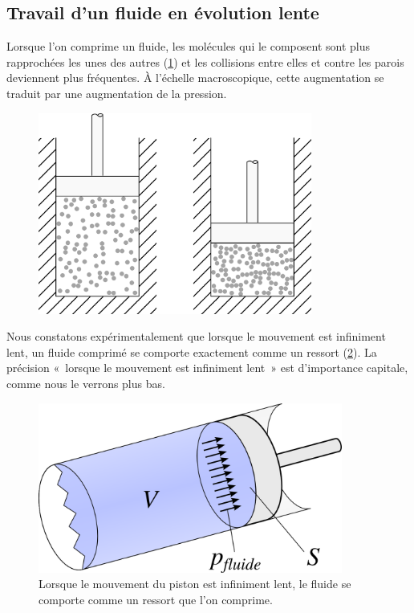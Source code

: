	\subsection{Travail d’un fluide en évolution lente}

		Lorsque l’on comprime un fluide, les molécules qui le composent sont plus rapprochées les unes des autres (\cref{fig_molécules_compression_lente}) et les collisions entre elles et contre les parois deviennent plus fréquentes. À l’échelle macroscopique, cette augmentation se traduit par une augmentation de la pression.
		
		\begin{figure}
			\begin{center}
			\includegraphics[width=9cm]{images/particules_compression_lente.png}
			\end{center}
			\label{fig_molécules_compression_lente}
		\end{figure}

		Nous constatons expérimentalement que lorsque le mouvement est infiniment lent, un fluide comprimé se comporte exactement comme un ressort (\cref{fig_piston_fluide_lent}). La précision «~lorsque le mouvement est infiniment lent~» est d’importance capitale, comme nous le verrons plus bas.

		\begin{figure}
			\begin{center}
			\includegraphics[width=10cm]{images/travail_cylindre_2.png}
			\end{center}
			\caption{Lorsque le mouvement du piston est infiniment lent, le fluide se comporte comme un ressort que l’on comprime.}
			\label{fig_piston_fluide_lent}
		\end{figure}

